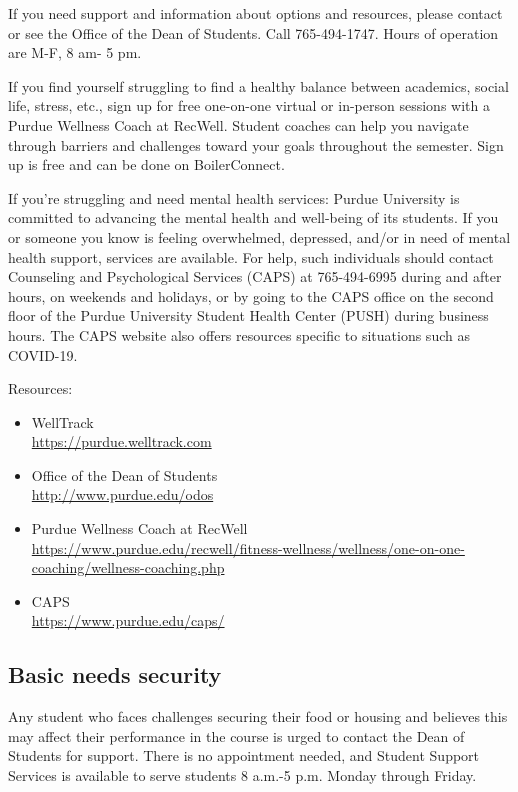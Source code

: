 \documentclass[letterpaper,11pt]{article}
\begin{document}
If you need support and information about options and resources, please contact
or see the Office of the Dean of Students. Call 765-494-1747. Hours of operation
are M-F, 8 am- 5 pm.

If you find yourself struggling to find a healthy balance between academics,
social life, stress, etc., sign up for free one-on-one virtual or in-person
sessions with a Purdue Wellness Coach at RecWell. Student coaches can help you
navigate through barriers and challenges toward your goals throughout the
semester. Sign up is free and can be done on BoilerConnect.

If you're struggling and need mental health services: Purdue University is
committed to advancing the mental health and well-being of its students. If you
or someone you know is feeling overwhelmed, depressed, and/or in need of mental
health support, services are available. For help, such individuals should
contact Counseling and Psychological Services (CAPS) at 765-494-6995 during and
after hours, on weekends and holidays, or by going to the CAPS office on the
second floor of the Purdue University Student Health Center (PUSH) during
business hours. The CAPS website also offers resources specific to situations
such as COVID-19.


Resources:
\begin{itemize}

\item
WellTrack\\
\url{https://purdue.welltrack.com}

\item
Office of the Dean of Students\\
\url{http://www.purdue.edu/odos}


\item
Purdue Wellness Coach at RecWell\\
\url{https://www.purdue.edu/recwell/fitness-wellness/wellness/one-on-one-coaching/wellness-coaching.php}

\item
CAPS\\
\url{https://www.purdue.edu/caps/}

\end{itemize}

\subsection*{Basic needs security}

Any student who faces challenges securing their food or housing and believes
this may affect their performance in the course is urged to contact the Dean of
Students for support. There is no appointment needed, and Student Support
Services is available to serve students 8 a.m.-5 p.m. Monday through Friday.
\end{document}
